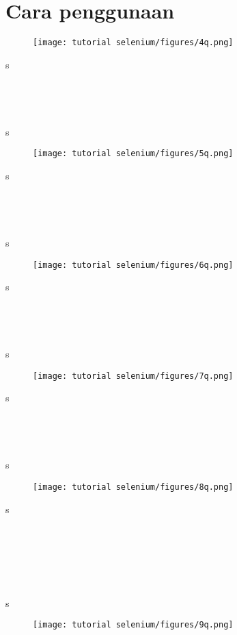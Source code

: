 \section{Cara penggunaan}

\begin{figure}[H]
\centering
\texttt{[image: tutorial selenium/figures/4q.png]}
\caption{}
\label{unicodeuni}
\end{figure}
s
\\
\\
\\
\\
\\
s
\begin{figure}[H]
\centering
\texttt{[image: tutorial selenium/figures/5q.png]}
\caption{}
\label{}
\end{figure}
s
\\
\\
\\
\\
\\
s
\begin{figure}[H]
\centering
\texttt{[image: tutorial selenium/figures/6q.png]}
\caption{}
\label{}
\end{figure}
s
\\
\\
\\
\\
\\
s
\begin{figure}[H]
\centering
\texttt{[image: tutorial selenium/figures/7q.png]}
\caption{}
\label{}
\end{figure}
s
\\
\\
\\
\\
\\
s
\begin{figure}[H]
\centering
\texttt{[image: tutorial selenium/figures/8q.png]}
\caption{}
\label{}
\end{figure}
s
\\
\\
\\
\\
\\
\\
\\
s
\begin{figure}[H]
\centering
\texttt{[image: tutorial selenium/figures/9q.png]}
\caption{}
\label{}
\end{figure}
